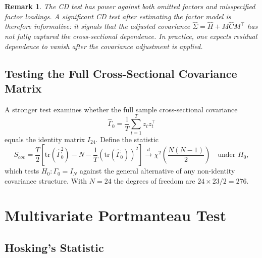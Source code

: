 \documentclass[12pt]{article}
\newtheorem{remark}{Remark}
\begin{document}
\begin{remark}
    The CD test has power against both omitted factors and misspecified factor loadings.
    A significant CD test after estimating the factor model is therefore informative: it
    signals that the adjusted covariance $\hat{\Sigma} = \hat{H} + M\hat{C}M^\top$ has not
    fully captured the cross-sectional dependence. In practice, one expects residual
    dependence to vanish after the covariance adjustment is applied.
\end{remark}

\subsection{Testing the Full Cross-Sectional Covariance Matrix}

A stronger test examines whether the full sample cross-sectional covariance
\begin{equation}
    \hat{\Gamma}_0 = \frac{1}{T} \sum_{t=1}^T z_t z_t^\top
\end{equation}
equals the identity matrix $I_{24}$. Define the statistic
\begin{equation}
    S_{cov} = \frac{T}{2} \left[\mathrm{tr}\!\left(\hat{\Gamma}_0^2\right) - N - \frac{1}{T}
    \left(\mathrm{tr}(\hat{\Gamma}_0)\right)^2\right]
    \overset{d}{\to} \chi^2\!\left(\frac{N(N-1)}{2}\right)
    \quad \text{under } H_0,
    \label{eq:covtest}
\end{equation}
which tests $H_0: \Gamma_0 = I_N$ against the general alternative of any non-identity
covariance structure. With $N = 24$ the degrees of freedom are $24 \times 23 / 2 = 276$.

\section{Multivariate Portmanteau Test}

\subsection{Hosking's Statistic}
\end{document}
